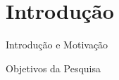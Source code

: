 \section{Introdução}

\begin{frame}{Introdução e Motivação}

\end{frame}

\begin{frame}{Objetivos da Pesquisa}

\end{frame}